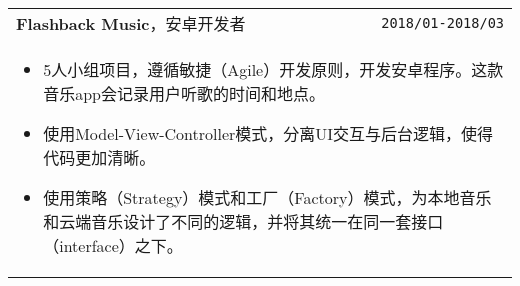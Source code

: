 \documentclass[UTF8]{ctexart}
\newcommand{\itemcols}[1]{
	\multicolumn{2}{p{\dimexpr \linewidth-2\tabcolsep}}{
		\begin{itemize}
			#1
		\end{itemize}
	}
}
\begin{document}
\begin{tabularx}{\linewidth}{X r}
		\textbf{\large Flashback Music}，安卓开发者 & \texttt{2018/01-2018/03} \\
		\itemcols{
			\item 5人小组项目，遵循敏捷（Agile）开发原则，开发安卓程序。这款音乐app会记录用户听歌的时间和地点。
			\item 使用Model-View-Controller模式，分离UI交互与后台逻辑，使得代码更加清晰。
			\item 使用策略（Strategy）模式和工厂（Factory）模式，为本地音乐和云端音乐设计了不同的逻辑，并将其统一在同一套接口（interface）之下。
		}
	\end{tabularx}

\begin{comment}
		\textbf{\large WayAround}，前端开发者 & \texttt{2018/01-2018/03} \\
\itemcols{
\item 4人小组项目，共同开发网页程序的视觉原型（mockup）。该导航软件允许用户根据喜好定义线路。
\item 在完成纸质原型后，使用Bootstrap和jQuery开发了首页。编写了两版首页以供A/B测试，分析用户选择喜好所花费的时间，以了解用户如何接触一款新产品，并根据结果修改首页使其对用户更加友好。
\item 完善评价页，根据用户之前选择的喜好动态生成表单，使页面更为精简。	
} \\
\end{comment}
\end{document}
